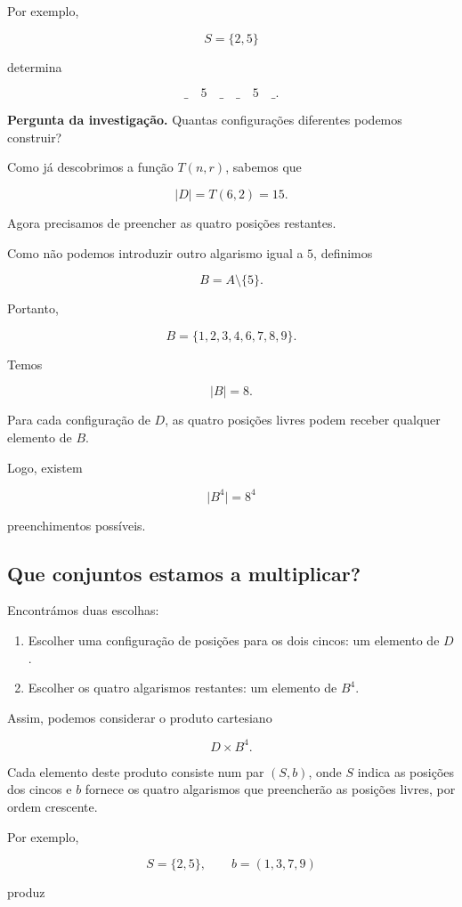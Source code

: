 \documentclass[11pt,a4paper,oneside]{book}
\newcommand{\Pergunta}[1]{\begin{perguntabox}\textbf{Pergunta da investigação.} #1\end{perguntabox}}
\newcommand{\card}[1]{\lvert #1\rvert}
\begin{document}
Por exemplo,

\[
S=\{2,5\}
\]

determina

\[
\_\quad5\quad\_\quad\_\quad5\quad\_.
\]

\Pergunta{Quantas configurações diferentes
podemos construir?}

Como já descobrimos a função $T(n,r)$,
sabemos que

\[
\card D=T(6,2)=15.
\]

Agora precisamos de preencher
as quatro posições restantes.

Como não podemos introduzir
outro algarismo igual a $5$,
definimos

\[
B=A\setminus\{5\}.
\]

Portanto,

\[
B=\{1,2,3,4,6,7,8,9\}.
\]

Temos

\[
\card B=8.
\]

Para cada configuração de $D$,
as quatro posições livres
podem receber qualquer elemento de $B$.

Logo, existem

\[
\card{B^4}=8^4
\]

preenchimentos possíveis.

\subsection*{Que conjuntos estamos a multiplicar?}

Encontrámos duas escolhas:

\begin{enumerate}
\item Escolher uma configuração de posições
para os dois cincos: um elemento de $D$.

\item Escolher os quatro algarismos restantes:
um elemento de $B^4$.
\end{enumerate}

Assim, podemos considerar o produto cartesiano

\[
D\times B^4.
\]

Cada elemento deste produto
consiste num par $(S,b)$,
onde $S$ indica as posições dos cincos
e $b$ fornece os quatro algarismos
que preencherão as posições livres,
por ordem crescente.

Por exemplo,

\[
S=\{2,5\},
\qquad
b=(1,3,7,9)
\]

produz
\end{document}
